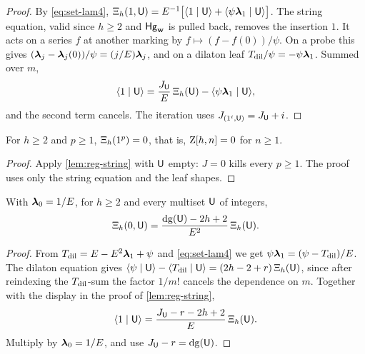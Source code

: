 \begin{proof}
By \cref{eq:set-lam4}, $\Xi_h(1,\mathsf{U})=E^{-1}\big[\langle 1\mid\mathsf{U}\rangle+\langle\psi\boldsymbol{\lambda}_1\mid\mathsf{U}\rangle\big]$. The string equation, valid since $h\geq 2$ and $\mathsf{Hg}_{\mathbf{w}}$ is pulled back, removes the insertion $1$. It acts on a series $f$ at another marking by $f\mapsto(f-f(0))/\psi$. On a probe this gives $(\boldsymbol{\lambda}_j-\boldsymbol{\lambda}_j(0))/\psi=(j/E)\boldsymbol{\lambda}_j$, and on a dilaton leaf $T_{\mathrm{dil}}/\psi=-\psi\boldsymbol{\lambda}_1$. Summed over $m$,
\[
\langle 1\mid\mathsf{U}\rangle=\frac{J_{\mathsf{U}}}{E}\,\Xi_h(\mathsf{U})-\langle\psi\boldsymbol{\lambda}_1\mid\mathsf{U}\rangle,
\]
and the second term cancels. The iteration uses $J_{(1^i,\mathsf{U})}=J_{\mathsf{U}}+i$.
\end{proof}

\begin{lem}[Vanishing on $1^p$]
\label{lem:reg-C}
For $h\geq 2$ and $p\geq 1$, $\Xi_h(1^p)=0$, that is, $\mathrm{Z}[h,n]=0$ for $n\geq 1$.
\end{lem}

\begin{proof}
Apply \cref{lem:reg-string} with $\mathsf{U}$ empty: $J=0$ kills every $p\geq 1$. The proof uses only the string equation and the leaf shapes.
\end{proof}

\begin{lem}
\label{lem:reg-L0}
With $\boldsymbol{\lambda}_0=1/E$, for $h\geq 2$ and every multiset $\mathsf{U}$ of integers,
\[
\Xi_h(0,\mathsf{U})=\frac{\mathrm{dg}(\mathsf{U})-2h+2}{E^2}\,\Xi_h(\mathsf{U}).
\]
\end{lem}

\begin{proof}
From $T_{\mathrm{dil}}=E-E^2\boldsymbol{\lambda}_1+\psi$ and \cref{eq:set-lam4} we get $\psi\boldsymbol{\lambda}_1=(\psi-T_{\mathrm{dil}})/E$. The dilaton equation gives $\langle\psi\mid\mathsf{U}\rangle-\langle T_{\mathrm{dil}}\mid\mathsf{U}\rangle=(2h-2+r)\,\Xi_h(\mathsf{U})$, since after reindexing the $T_{\mathrm{dil}}$-sum the factor $1/m!$ cancels the dependence on $m$. Together with the display in the proof of \cref{lem:reg-string},
\[
\langle 1\mid\mathsf{U}\rangle=\frac{J_{\mathsf{U}}-r-2h+2}{E}\,\Xi_h(\mathsf{U}).
\]
Multiply by $\boldsymbol{\lambda}_0=1/E$, and use $J_{\mathsf{U}}-r=\mathrm{dg}(\mathsf{U})$.
\end{proof}

